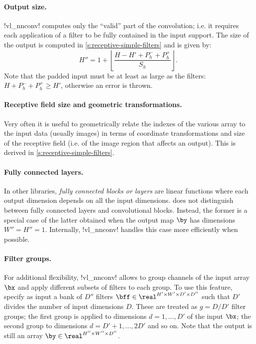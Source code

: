 \paragraph{Output size.} !vl_nnconv! computes only the ``valid'' part of the convolution; i.e. it requires each application of a filter to be fully contained in the input support.  The size of the output is computed in \cref{s:receptive-simple-filters} and is given by:
\[
  H'' = 1 + \left\lfloor \frac{H - H' + P_h^- + P_h^+}{S_h} \right\rfloor.
\]
Note that the padded input must be at least as large as the filters: $H +P_h^- + P_h^+ \geq H'$, otherwise an error is thrown.

\paragraph{Receptive field size and geometric transformations.} Very often it is useful to geometrically relate the indexes of the various array to the input data (usually images) in terms of coordinate transformations and size of the receptive field (i.e. of the image region that affects an output). This is derived in \cref{s:receptive-simple-filters}.

\paragraph{Fully connected layers.} In other libraries, \emph{fully connected blocks or layers} are linear functions where each output dimension depends on all the input dimensions. \matconvnet does not distinguish between fully connected layers and convolutional blocks. Instead, the former is a special case of the latter obtained when the output map $\by$ has dimensions $W''=H''=1$. Internally, !vl_nnconv! handles this case more efficiently when possible.

\paragraph{Filter groups.} For additional flexibility, !vl_nnconv! allows to group channels of the input array $\bx$ and apply different subsets of filters to each group. To use this feature, specify as input a bank  of $D''$ filters $\bff\in\real^{H'\times W'\times D'\times D''}$ such that $D'$ divides the number of input dimensions $D$. These are treated as $g=D/D'$ filter groups; the first group is applied to dimensions $d=1,\dots,D'$ of the input $\bx$; the second group to dimensions $d=D'+1,\dots,2D'$ and so on. Note that the output is still an array $\by\in\real^{H''\times W''\times D''}$.


